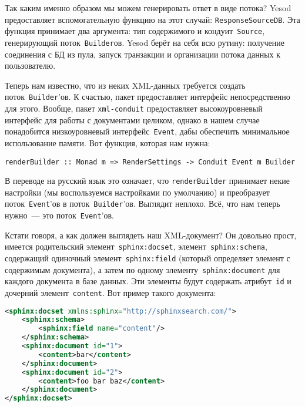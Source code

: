 Так каким именно образом мы можем генерировать ответ в виде потока? Yesod
предоставляет вспомогательную функцию на этот случай:
\lstinline'ResponseSourceDB'. Эта функция принимает два аргумента: тип
содержимого и кондуит~\lstinline'Source', генерирующий
поток~\lstinline'Builder'ов. Yesod берёт на себя всю рутину: получение
соединения с БД из пула, запуск транзакции и организации потока данных к
пользователю.

Теперь нам известно, что из неких XML-данных требуется создать
поток~\lstinline!Builder!'ов. К счастью, пакет
предоставляет интерфейс непосредственно для этого. Вообще, пакет
\texttt{xml-conduit} предоставляет высокоуровневый интерфейс для работы с
документами целиком, однако в нашем случае понадобится низкоуровневый
интерфейс~\lstinline'Event', дабы обеспечить минимальное использование памяти.
Вот функция, которая нам нужна:
\begin{lstlisting}
renderBuilder :: Monad m => RenderSettings -> Conduit Event m Builder
\end{lstlisting}

В переводе на русский язык это означает, что \lstinline'renderBuilder'
принимает некие настройки (мы воспользуемся настройками по умолчанию) и
преобразует поток~\lstinline!Event!'ов в поток~\lstinline!Builder!'ов. Выглядит
неплохо. Всё, что нам теперь нужно~--- это поток~\lstinline!Event!'ов.

Кстати говоря, а как должен выглядеть наш XML-документ? Он довольно прост,
имеется родительский элемент~\lstinline'sphinx:docset',
элемент~\lstinline'sphinx:schema', содержащий одиночный
элемент~\lstinline'sphinx:field' (который определяет элемент с содержимым
документа), а затем по одному элементу~\lstinline'sphinx:document' для каждого
документа в базе данных. Эти элементы будут содержать атрибут~\lstinline'id' и
дочерний элемент~\lstinline'content'. Вот пример такого документа:
\begin{lstlisting}[language=XML,caption=Пример xmlpipe-документа]
<sphinx:docset xmlns:sphinx="http://sphinxsearch.com/">
    <sphinx:schema>
        <sphinx:field name="content"/>
    </sphinx:schema>
    <sphinx:document id="1">
        <content>bar</content>
    </sphinx:document>
    <sphinx:document id="2">
        <content>foo bar baz</content>
    </sphinx:document>
</sphinx:docset>
\end{lstlisting}

